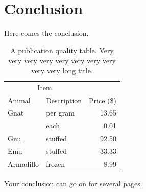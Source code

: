 \documentclass[msc,oneside]{ubcthesis}%
\begin{document}
\chapter{Conclusion}
Here comes the conclusion.
\begin{table}[tbph]
\centering
\caption{A publication quality table. Very very very very very very very very very very long title.
\label{table:food1}}
\begin{tabular}{@{}llr@{}} \toprule 
\multicolumn{2}{c}{Item} \\ \cmidrule(r){1-2} 
Animal & Description & Price (\$)\\ \midrule 
Gnat & per gram & 13.65 \\ 
& each & 0.01 \\ 
Gnu & stuffed & 92.50 \\ 
Emu & stuffed & 33.33 \\ 
Armadillo & frozen & 8.99 \\ \bottomrule 
\end{tabular}
\end{table}

\newpage
Your conclusion can go on for several pages.





\end{document}
